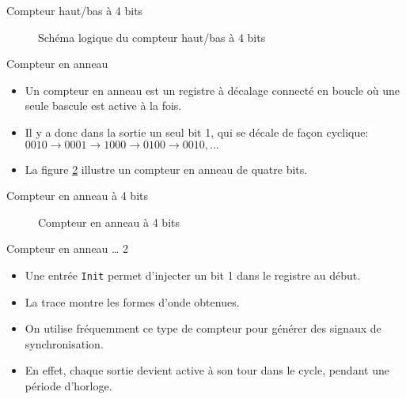 \documentclass[presentation]{beamer}
\begin{document}
\begin{frame}[label={sec:org0ac1466}]{Compteur haut/bas à 4 bits}
\begin{figure}[htbp]
\centering

\caption{\label{fig:org5c81fda}Schéma logique du compteur haut/bas à 4 bits}
\end{figure}
\end{frame}

\begin{frame}[label={sec:org27ed352}]{Compteur en anneau}
\begin{itemize}
\item Un compteur en anneau est un registre à décalage connecté en boucle où une seule bascule est active à la fois.

\item Il y a donc dans la sortie un seul bit 1, qui se décale de façon cyclique: \(0010 \rightarrow 0001 \rightarrow 1000 \rightarrow 0100 \rightarrow 0010, \ldots\)

\item La figure \ref{fig:org1945e5b} illustre un compteur en anneau de quatre bits.
\end{itemize}
\end{frame}

\begin{frame}[label={sec:org8e5569a}]{Compteur en anneau à 4 bits}
\begin{figure}[htbp]
\centering

\caption{\label{fig:org1945e5b}Compteur en anneau à 4 bits}
\end{figure}
\end{frame}

\begin{frame}[label={sec:org51faa28},fragile]{Compteur en anneau \ldots{} 2}
 \begin{itemize}
\item Une entrée \texttt{Init} permet d'injecter un bit 1 dans le registre au début.

\item La trace montre les formes d'onde obtenues.

\item On utilise fréquemment ce type de compteur pour générer des signaux de synchronisation.

\item En effet, chaque sortie devient active à son tour dans le cycle, pendant une période d'horloge.
\end{itemize}
\end{frame}
\end{document}
